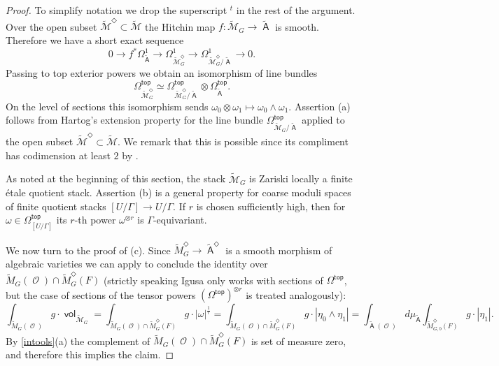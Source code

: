 \documentclass{article}
\DeclareMathOperator{\A}{\mathsf{A}}
\newcommand{\Mc}{\mathcal{M}}
\DeclareMathOperator{\vol}{\mathsf{vol}}
\DeclareMathOperator{\Oo}{\mathcal{O}}
\renewcommand{\top}{\mathsf{top}}
\theoremstyle{definition}
\theoremstyle{plain}
\begin{document}
\begin{proof}
To simplify notation we drop the superscript ${}^t$ in the rest of the argument. 
Over the open subset $\widetilde{\Mc}^{\Diamond} \subset \widetilde{\Mc}$ the Hitchin map $f\colon \widetilde{\Mc}_G \to \widetilde{\A}$ is smooth. Therefore we have a short exact sequence
$$0 \to f^*\Omega_{\widetilde{\A}}^1 \to \Omega_{\widetilde{\Mc}^{\Diamond}_G}^1 \to \Omega_{\widetilde{\Mc}^{\Diamond}_G/\widetilde{\A}}^1 \to 0.$$
Passing to top exterior powers we obtain an isomorphism of line bundles 
\begin{equation}\label{eqn:det}
\Omega_{\widetilde{\Mc}^{\Diamond}_G}^{\top} \simeq \Omega_{\widetilde{\Mc}^{\Diamond}_G/\widetilde{\A}}^{\top} \otimes \Omega_{\widetilde{\A}}^{\top}.
\end{equation}
On the level of sections this isomorphism sends $\omega_0 \otimes \omega_1 \mapsto \omega_0 \wedge \omega_1$.
Assertion (a) follows from Hartog's extension property for the line bundle $\Omega^{\top}_{\widetilde{\Mc}_{G}/\widetilde{\A}}$ applied to the open subset $\widetilde{\Mc}^{\Diamond} \subset \widetilde{\Mc}$. We remark that this is possible since its compliment has codimension at least $2$ by \cite[Proposition 4.16.1]{MR2653248}.

As noted at the beginning of this section, the stack $\widetilde{\Mc}_G$ is Zariski locally a finite \'etale quotient stack. Assertion (b) is a general property for coarse moduli spaces of finite quotient stacks $[U/\Gamma] \to U/\Gamma$. If $r$ is chosen sufficiently high, then for $\omega \in \Omega^{\top}_{[U/\Gamma]}$ its $r$-th power $\omega^{\otimes r}$ is $\Gamma$-equivariant.

We now turn to the proof of (c). Since $\widetilde{M}_G^{\Diamond} \to \widetilde{\A}^\Diamond$ is a smooth morphism of algebraic varieties we can apply \cite[Theorem 7.6.1]{MR1743467} to conclude the identity over $\widetilde{M}_G(\Oo) \cap \widetilde{M}^{\Diamond}_G(F)$ (strictly speaking Igusa only works with sections of $\Omega^{\top}$, but the case of sections of the tensor powers $(\Omega^{\top})^{\otimes r}$ is treated analogously):
$$\int_{\widetilde{M}_G(\Oo)} g \cdot{} \vol_{\widetilde{\Mc}_G}= \int_{\widetilde{M}_G(\Oo) \cap \widetilde{M}_G^{\Diamond}(F)} g \cdot{} |\omega|^{\frac{1}{r}} = \int_{\widetilde{M}_G(\Oo) \cap \widetilde{M}_G^{\Diamond}(F)} g \cdot{} |\eta_0 \wedge \eta_1|  = \int_{\widetilde{\A}(\Oo)} d\mu_{\widetilde{\A}} \int_{\widetilde{M}_{G,b}^{\Diamond}(F)} g\cdot{} |\eta_1|.$$
By \ref{intools}(a) the complement of $\widetilde{M}_G(\Oo) \cap \widetilde{M}_G^{\Diamond}(F)$ is set of measure zero, and therefore this implies the claim.
\end{proof}
\end{document}
